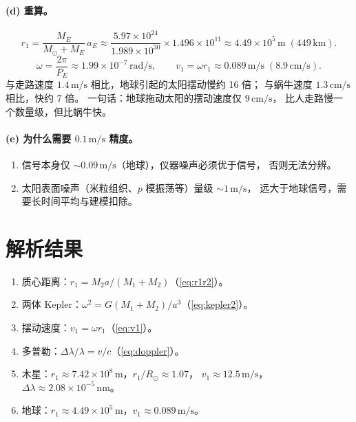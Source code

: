 \documentclass[UTF8,a4paper,11pt]{ctexart}
\begin{document}
\paragraph{(d) 重算。}
\begin{equation}
  r_1=\frac{M_E}{M_\odot+M_E}\,a_E
  \approx\frac{5.97\times10^{24}}{1.989\times10^{30}}\times1.496\times10^{11}
  \approx 4.49\times10^5\,\mathrm m\;(449\,\mathrm{km}).
\end{equation}
\begin{equation}
  \omega=\frac{2\pi}{P_E}\approx1.99\times10^{-7}\,\mathrm{rad/s},\qquad
  v_1=\omega r_1\approx 0.089\,\mathrm{m/s}\;(8.9\,\mathrm{cm/s}).
\end{equation}
与走路速度 $1.4\,\mathrm{m/s}$ 相比，地球引起的太阳摆动慢约 16 倍；
与蜗牛速度 $1.3\,\mathrm{cm/s}$ 相比，快约 7 倍。
一句话：地球拖动太阳的摆动速度仅 $9\,\mathrm{cm/s}$，
比人走路慢一个数量级，但比蜗牛快。

\paragraph{(e) 为什么需要 $0.1\,\mathrm{m/s}$ 精度。}
\begin{enumerate}
  \item 信号本身仅 $\sim 0.09\,\mathrm{m/s}$（地球），仪器噪声必须优于信号，
        否则无法分辨。
  \item 太阳表面噪声（米粒组织、$p$ 模振荡等）量级 $\sim 1\,\mathrm{m/s}$，
        远大于地球信号，需要长时间平均与建模扣除。
\end{enumerate}

\section{解析结果}
\label{sec:result}

\begin{enumerate}
  \item 质心距离：$r_1=M_2 a/(M_1+M_2)$（\eqref{eq:r1r2}）。
  \item 两体 Kepler：$\omega^2=G(M_1+M_2)/a^3$（\eqref{eq:kepler2}）。
  \item 摆动速度：$v_1=\omega r_1$（\eqref{eq:v1}）。
  \item 多普勒：$\Delta\lambda/\lambda=v/c$（\eqref{eq:doppler}）。
  \item 木星：$r_1\approx7.42\times10^8\,\mathrm m$，$r_1/R_\odot\approx1.07$，
        $v_1\approx12.5\,\mathrm{m/s}$，$\Delta\lambda\approx2.08\times10^{-5}\,\mathrm{nm}$。
  \item 地球：$r_1\approx4.49\times10^5\,\mathrm m$，$v_1\approx0.089\,\mathrm{m/s}$。
\end{enumerate}
\end{document}
